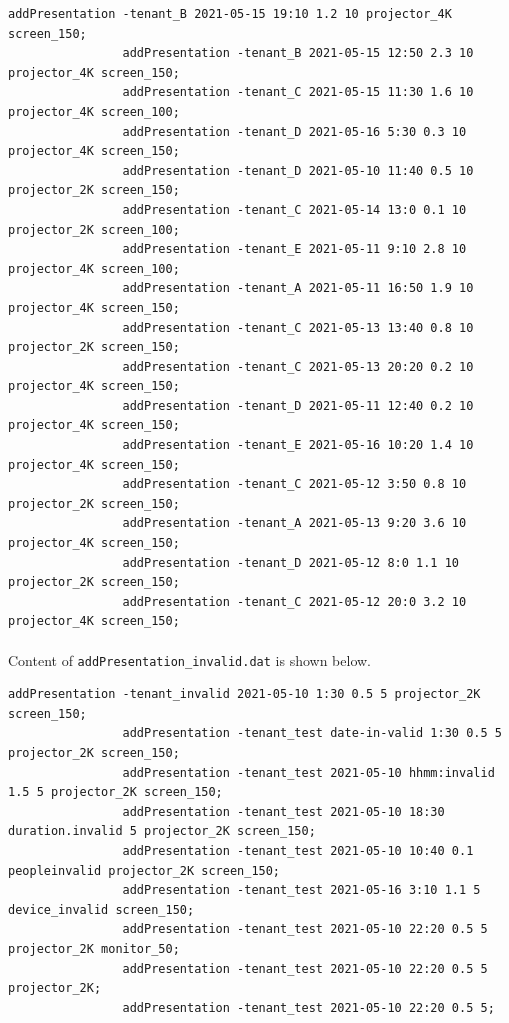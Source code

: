 \documentclass{article}
\begin{document}
\begin{Verbatim}[gobble=8]
                addPresentation -tenant_B 2021-05-15 19:10 1.2 10 projector_4K screen_150;
                addPresentation -tenant_B 2021-05-15 12:50 2.3 10 projector_4K screen_150;
                addPresentation -tenant_C 2021-05-15 11:30 1.6 10 projector_4K screen_100;
                addPresentation -tenant_D 2021-05-16 5:30 0.3 10 projector_4K screen_150;
                addPresentation -tenant_D 2021-05-10 11:40 0.5 10 projector_2K screen_150;
                addPresentation -tenant_C 2021-05-14 13:0 0.1 10 projector_2K screen_100;
                addPresentation -tenant_E 2021-05-11 9:10 2.8 10 projector_4K screen_100;
                addPresentation -tenant_A 2021-05-11 16:50 1.9 10 projector_4K screen_150;
                addPresentation -tenant_C 2021-05-13 13:40 0.8 10 projector_2K screen_150;
                addPresentation -tenant_C 2021-05-13 20:20 0.2 10 projector_4K screen_150;
                addPresentation -tenant_D 2021-05-11 12:40 0.2 10 projector_4K screen_150;
                addPresentation -tenant_E 2021-05-16 10:20 1.4 10 projector_4K screen_150;
                addPresentation -tenant_C 2021-05-12 3:50 0.8 10 projector_2K screen_150;
                addPresentation -tenant_A 2021-05-13 9:20 3.6 10 projector_4K screen_150;
                addPresentation -tenant_D 2021-05-12 8:0 1.1 10 projector_2K screen_150;
                addPresentation -tenant_C 2021-05-12 20:0 3.2 10 projector_4K screen_150;
            \end{Verbatim}
            \paragraph{}
                Content of \texttt{addPresentation\_invalid.dat} is shown below.
            \begin{Verbatim}[gobble=8]
                addPresentation -tenant_invalid 2021-05-10 1:30 0.5 5 projector_2K screen_150;
                addPresentation -tenant_test date-in-valid 1:30 0.5 5 projector_2K screen_150;
                addPresentation -tenant_test 2021-05-10 hhmm:invalid 1.5 5 projector_2K screen_150;
                addPresentation -tenant_test 2021-05-10 18:30 duration.invalid 5 projector_2K screen_150;
                addPresentation -tenant_test 2021-05-10 10:40 0.1 peopleinvalid projector_2K screen_150;
                addPresentation -tenant_test 2021-05-16 3:10 1.1 5 device_invalid screen_150;
                addPresentation -tenant_test 2021-05-10 22:20 0.5 5 projector_2K monitor_50;
                addPresentation -tenant_test 2021-05-10 22:20 0.5 5 projector_2K;
                addPresentation -tenant_test 2021-05-10 22:20 0.5 5;
            \end{Verbatim}
\end{document}
